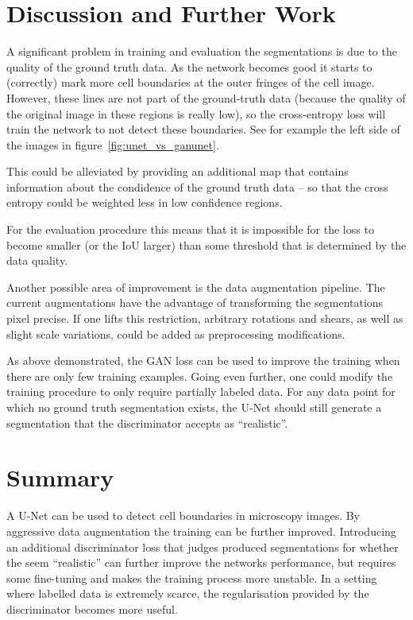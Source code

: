 \documentclass[aps,prl,twocolumn,groupedaddress,amsmath,amssymb]{revtex4-1}
\begin{document}
    \section{Discussion and Further Work}
    A significant problem in training and evaluation the segmentations is due to the quality of the
    ground truth data. As the network becomes good it starts to (correctly) mark more cell 
    boundaries at the outer fringes of the cell image. However, these lines are not part of the 
    ground-truth data (because the quality of the original image in these regions is really low), so
    the cross-entropy loss will train the network to not detect these boundaries. See for example 
    the left side of the images in figure~\ref{fig:unet_vs_ganunet}.

    This could be alleviated by providing an additional map that contains information about the 
    condidence of the ground truth data -- so that the cross entropy could be weighted less in low
    confidence regions.

    For the evaluation procedure this means that it is impossible for the loss to become smaller 
    (or the IoU larger) than some threshold that is determined by the data quality.

    Another possible area of improvement is the data augmentation pipeline. The current 
    augmentations have the advantage of transforming the segmentations pixel precise. If one lifts 
    this restriction, arbitrary rotations and shears, as well as slight scale variations, could be
    added as preprocessing modifications.

    As above demonstrated, the GAN loss can be used to improve the training when there are only few
    training examples. Going even further, one could modify the training procedure to only require 
    partially labeled data. For any data point for which no ground truth segmentation exists, the 
    U-Net should still generate a segmentation that the discriminator accepts as ``realistic''. 


    \section{Summary}

    A U-Net can be used to detect cell boundaries in microscopy images. By aggressive data
    augmentation the training can be further improved. Introducing an additional discriminator loss
    that judges produced segmentations for whether the seem ``realistic'' can further improve the 
    networks performance, but requires some fine-tuning and makes the training process more 
    unstable. In a setting where labelled data is extremely scarce, the regularisation provided
    by the discriminator becomes more useful.




    
     
\end{document}
